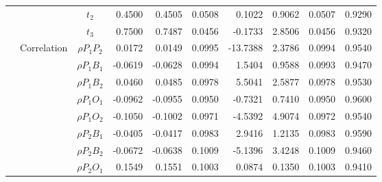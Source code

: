 \documentclass[letterpaper]{article}
\begin{document}
\begin{table}[h]
\begin{tabular}{cccrrrrrrr}
            &             & $t_2$          & 0.4500                 & 0.4505                 & 0.0508                 & 0.1022                 & 0.9062                 & 0.0507                   & 0.9290                 \\
            &             & $t_3$          & 0.7500                 & 0.7487                 & 0.0456                 & -0.1733                & 2.8506                 & 0.0456                   & 0.9320                 \\
            & Correlation & $\rho{P_1P_2}$ & 0.0172                 & 0.0149                 & 0.0995                 & -13.7388               & 2.3786                 & 0.0994                   & 0.9540                 \\
            &             & $\rho{P_1B_1}$ & -0.0619                & -0.0628                & 0.0994                 & 1.5404                 & 0.9588                 & 0.0993                   & 0.9470                 \\
            &             & $\rho{P_1B_2}$ & 0.0460                 & 0.0485                 & 0.0978                 & 5.5041                 & 2.5877                 & 0.0978                   & 0.9530                 \\
            &             & $\rho{P_1O_1}$ & -0.0962                & -0.0955                & 0.0950                 & -0.7321                & 0.7410                 & 0.0950                   & 0.9600                 \\
            &             & $\rho{P_1O_2}$ & -0.1050                & -0.1002                & 0.0971                 & -4.5392                & 4.9074                 & 0.0972                   & 0.9540                 \\
            &             & $\rho{P_2B_1}$ & -0.0405                & -0.0417                & 0.0983                 & 2.9416                 & 1.2135                 & 0.0983                   & 0.9590                 \\
            &             & $\rho{P_2B_2}$ & -0.0672                & -0.0638                & 0.1009                 & -5.1396                & 3.4248                 & 0.1009                   & 0.9460                 \\
            &             & $\rho{P_2O_1}$ & 0.1549                 & 0.1551                 & 0.1003                 & 0.0874                 & 0.1350                 & 0.1003                   & 0.9410                 \\

\end{tabular}
\end{table}
\end{document}

